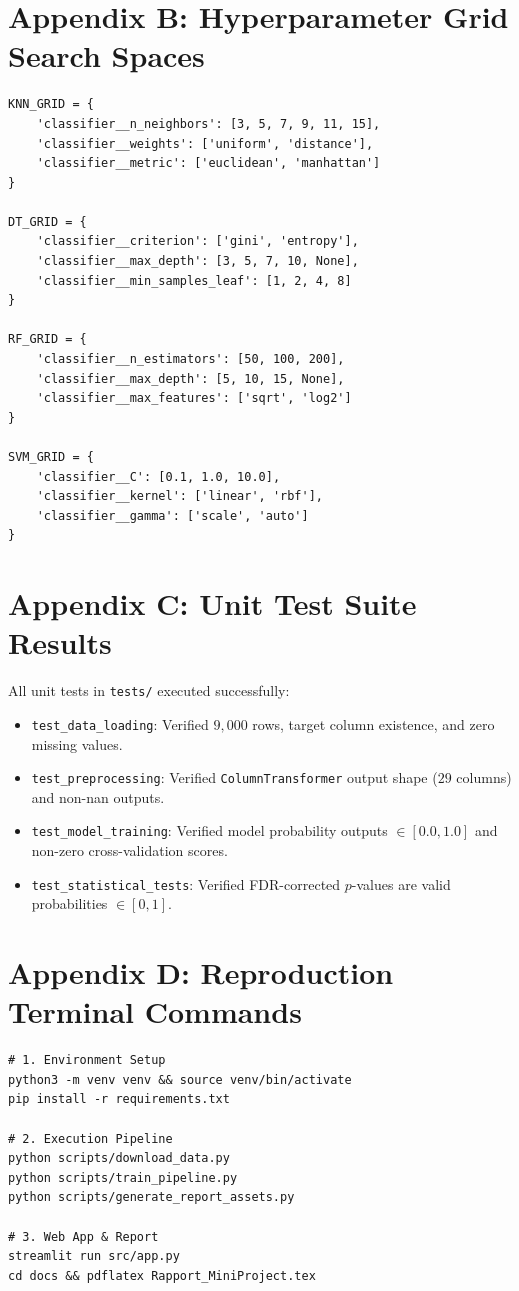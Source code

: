 \section{Appendix B: Hyperparameter Grid Search Spaces}
\begin{verbatim}
KNN_GRID = {
    'classifier__n_neighbors': [3, 5, 7, 9, 11, 15],
    'classifier__weights': ['uniform', 'distance'],
    'classifier__metric': ['euclidean', 'manhattan']
}

DT_GRID = {
    'classifier__criterion': ['gini', 'entropy'],
    'classifier__max_depth': [3, 5, 7, 10, None],
    'classifier__min_samples_leaf': [1, 2, 4, 8]
}

RF_GRID = {
    'classifier__n_estimators': [50, 100, 200],
    'classifier__max_depth': [5, 10, 15, None],
    'classifier__max_features': ['sqrt', 'log2']
}

SVM_GRID = {
    'classifier__C': [0.1, 1.0, 10.0],
    'classifier__kernel': ['linear', 'rbf'],
    'classifier__gamma': ['scale', 'auto']
}
\end{verbatim}

\section{Appendix C: Unit Test Suite Results}
All unit tests in \texttt{tests/} executed successfully:
\begin{itemize}
    \item \texttt{test\_data\_loading}: Verified $9,000$ rows, target column existence, and zero missing values.
    \item \texttt{test\_preprocessing}: Verified \texttt{ColumnTransformer} output shape ($29$ columns) and non-nan outputs.
    \item \texttt{test\_model\_training}: Verified model probability outputs $\in [0.0, 1.0]$ and non-zero cross-validation scores.
    \item \texttt{test\_statistical\_tests}: Verified FDR-corrected $p$-values are valid probabilities $\in [0, 1]$.
\end{itemize}

\section{Appendix D: Reproduction Terminal Commands}
\begin{verbatim}
# 1. Environment Setup
python3 -m venv venv && source venv/bin/activate
pip install -r requirements.txt

# 2. Execution Pipeline
python scripts/download_data.py
python scripts/train_pipeline.py
python scripts/generate_report_assets.py

# 3. Web App & Report
streamlit run src/app.py
cd docs && pdflatex Rapport_MiniProject.tex
\end{verbatim}
